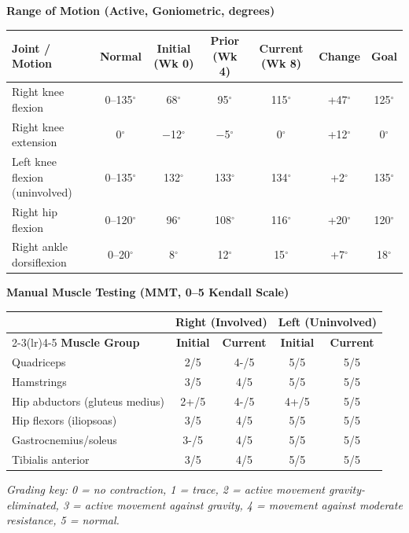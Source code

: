 \documentclass[10pt,letterpaper]{article}
\begin{document}
\textbf{\color{ptslate}Range of Motion (Active, Goniometric, degrees)}

\begin{tabularx}{\linewidth}{@{}Xcccccc@{}}
\toprule
\textbf{Joint / Motion} & \textbf{Normal} & \textbf{Initial (Wk 0)} & \textbf{Prior (Wk 4)} & \textbf{Current (Wk 8)} & \textbf{Change} & \textbf{Goal} \\
\midrule
Right knee flexion & 0--135$^\circ$ & 68$^\circ$ & 95$^\circ$ & 115$^\circ$ & \textcolor{ptgreen}{+47$^\circ$} & 125$^\circ$ \\
Right knee extension & 0$^\circ$ & $-$12$^\circ$ & $-$5$^\circ$ & 0$^\circ$ & \textcolor{ptgreen}{+12$^\circ$} & 0$^\circ$ \\
Left knee flexion (uninvolved) & 0--135$^\circ$ & 132$^\circ$ & 133$^\circ$ & 134$^\circ$ & \textcolor{ptgreen}{+2$^\circ$} & 135$^\circ$ \\
Right hip flexion & 0--120$^\circ$ & 96$^\circ$ & 108$^\circ$ & 116$^\circ$ & \textcolor{ptgreen}{+20$^\circ$} & 120$^\circ$ \\
Right ankle dorsiflexion & 0--20$^\circ$ & 8$^\circ$ & 12$^\circ$ & 15$^\circ$ & \textcolor{ptgreen}{+7$^\circ$} & 18$^\circ$ \\
\bottomrule
\end{tabularx}

\vspace{6pt}
\textbf{\color{ptslate}Manual Muscle Testing (MMT, 0--5 Kendall Scale)}

\begin{tabularx}{\linewidth}{@{}X cc cc@{}}
\toprule
& \multicolumn{2}{c}{\textbf{Right (Involved)}} & \multicolumn{2}{c}{\textbf{Left (Uninvolved)}} \\
\cmidrule(lr){2-3}\cmidrule(lr){4-5}
\textbf{Muscle Group} & \textbf{Initial} & \textbf{Current} & \textbf{Initial} & \textbf{Current} \\
\midrule
Quadriceps & 2/5 & \cellcolor{ptgreen!15}4-/5 & 5/5 & 5/5 \\
Hamstrings & 3/5 & \cellcolor{ptgreen!15}4/5 & 5/5 & 5/5 \\
Hip abductors (gluteus medius) & 2+/5 & \cellcolor{ptgreen!15}4-/5 & 4+/5 & 5/5 \\
Hip flexors (iliopsoas) & 3/5 & \cellcolor{ptgreen!15}4/5 & 5/5 & 5/5 \\
Gastrocnemius/soleus & 3-/5 & \cellcolor{ptgreen!15}4/5 & 5/5 & 5/5 \\
Tibialis anterior & 3/5 & 4/5 & 5/5 & 5/5 \\
\bottomrule
\end{tabularx}
\vspace{2pt}
{\footnotesize\color{ptslate}\textit{Grading key: 0 = no contraction, 1 = trace, 2 = active movement gravity-eliminated, 3 = active movement against gravity, 4 = movement against moderate resistance, 5 = normal.}}
\end{document}
